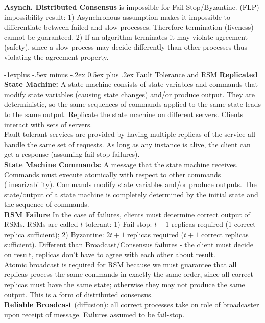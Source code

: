\documentclass[9pt,landscape]{article}
\makeatletter
\renewcommand{\subsection}{\@startsection{subsection}{2}{0mm}%
                                {-1explus -.5ex minus -.2ex}%
                                {0.5ex plus .2ex}%
                                {\normalfont\normalsize\bfseries}}
\makeatother
\begin{document}
\begin{multicols}{3}
{\bf Asynch. Distributed Consensus} is impossible for Fail-Stop/Byzantine. (FLP) impossibility result: 1) Asynchronous assumption makes it impossible to differentiate between failed and slow processes. Therefore termination (liveness) cannot be guaranteed. 2) If an algorithm terminates it may violate agreement (safety), since a slow process may decide differently than other processes thus violating the agreement property.

\subsection{Fault Tolerance and RSM}
{\bf Replicated State Machine:} A state machine consists of state variables and commands that modify state variables (causing state changes) and/or produce output. They are deterministic, so the same sequences of commands applied to the same state leads to the same output. Replicate the state machine on different servers. Clients interact with sets of servers.\\
Fault tolerant services are provided by having multiple replicas of the service all handle the same set of requests. As long as any instance is alive, the client can get a response (assuming fail-stop failures).\\
{\bf State Machine Commands:} A message that the state machine receives. 
Commands must execute atomically with respect to other commands (linearizability). Commands modify state variables and/or produce outputs. The state/output of a state machine is completely determined by the initial state and the sequence of commands.\\
{\bf RSM Failure} In the case of failures, clients must determine correct output of RSMs. RSMs are called $t$-tolerant: 1) Fail-stop: $t + 1$ replicas required (1 correct replica sufficient); 2) Byzantine: $2t + 1$ replicas required ($t + 1$ correct replicas sufficient). Different than Broadcast/Consensus failures - the client must decide on result, replicas don't have to agree with each other about result.\\
Atomic broadcast is required for RSM because we must guarantee that all replicas process the same commands in exactly the same order, since all correct replicas must have the same state; otherwise they may not produce the same output. This is a form of distributed consensus.\\
{\bf Reliable Broadcast} (diffusion): all correct processes take on role of broadcaster upon receipt of message. Failures assumed to be fail-stop.

\end{multicols}
\end{document}
